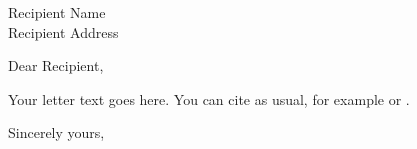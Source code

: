 \documentclass[11pt, autobio,autobib]{iitletterProf}
\date{\today}
\begin{document}
\begin{letter}{Recipient Name\\Recipient Address}

\opening{Dear Recipient,}

Your letter text goes here. You can cite as usual,
for example \textcite{Hic97a} or \parencite{Hic97a}.

\closing{Sincerely yours,}

\end{letter}
\end{document}
